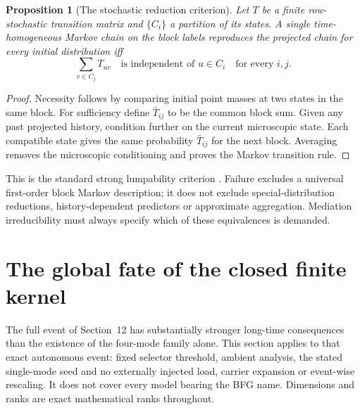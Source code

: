 \documentclass[11pt,letterpaper]{article}
\newtheorem{proposition}[theorem]{Proposition}
\theoremstyle{definition}
\numberwithin{equation}{section}
\begin{document}
\begin{proposition}[The stochastic reduction criterion]\label{lumping}
Let $T$ be a finite row-stochastic transition matrix and $\{C_i\}$ a partition of its states. A single time-homogeneous Markov chain on the block labels reproduces the projected chain for every initial distribution iff
\begin{equation}
\sum_{v\in C_j}T_{uv}\quad\text{is independent of }u\in C_i
\quad\text{for every }i,j.
\end{equation}
\end{proposition}
\begin{proof}
Necessity follows by comparing initial point masses at two states in the same block. For sufficiency define $\bar T_{ij}$ to be the common block sum. Given any past projected history, condition further on the current microscopic state. Each compatible state gives the same probability $\bar T_{ij}$ for the next block. Averaging removes the microscopic conditioning and proves the Markov transition rule.
\end{proof}
This is the standard strong lumpability criterion \cite{buchholz}. Failure excludes a universal first-order block Markov description; it does not exclude special-distribution reductions, history-dependent predictors or approximate aggregation. Mediation irreducibility must always specify which of these equivalences is demanded.

\section{The global fate of the closed finite kernel}
The full event of Section~12 has substantially stronger long-time consequences than the existence of the four-mode family alone. This section applies to that exact autonomous event: fixed selector threshold, ambient analysis, the stated single-mode seed and no externally injected load, carrier expansion or event-wise rescaling. It does not cover every model bearing the BFG name. Dimensions and ranks are exact mathematical ranks throughout.
\end{document}
